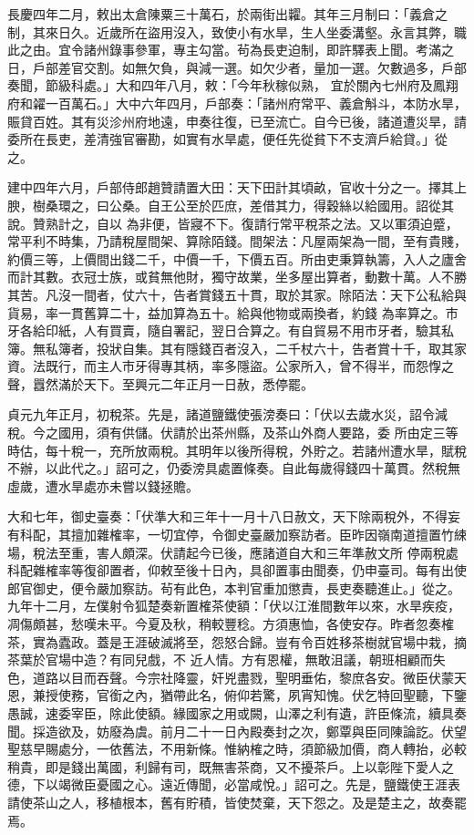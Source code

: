 \begin{pinyinscope}
 長慶四年二月，敕出太倉陳粟三十萬石，於兩街出糶。其年三月制曰：「義倉之制，其來日久。近歲所在盜用沒入，致使小有水旱，生人坐委溝壑。永言其弊，職此之由。宜令諸州錄事參軍，專主勾當。茍為長吏迫制，即許驛表上聞。考滿之日，戶部差官交割。如無欠負，與減一選。如欠少者，量加一選。欠數過多，戶部奏聞，節級科處。」大和四年八月，敕：「今年秋稼似熟，
 宜於關內七州府及鳳翔府和糴一百萬石。」大中六年四月，戶部奏：「諸州府常平、義倉斛斗，本防水旱，賑貸百姓。其有災沴州府地遠，申奏往復，已至流亡。自今已後，諸道遭災旱，請委所在長吏，差清強官審勘，如實有水旱處，便任先從貧下不支濟戶給貸。」從之。



 建中四年六月，戶部侍郎趙贊請置大田：天下田計其頃畝，官收十分之一。擇其上腴，樹桑環之，曰公桑。自王公至於匹庶，差借其力，得穀絲以給國用。詔從其說。贊熟計之，自以
 為非便，皆寢不下。復請行常平稅茶之法。又以軍須迫蹙，常平利不時集，乃請稅屋間架、算除陌錢。間架法：凡屋兩架為一間，至有貴賤，約價三等，上價間出錢二千，中價一千，下價五百。所由吏秉算執籌，入人之廬舍而計其數。衣冠士族，或貧無他財，獨守故業，坐多屋出算者，動數十萬。人不勝其苦。凡沒一間者，仗六十，告者賞錢五十貫，取於其家。除陌法：天下公私給與貨易，率一貫舊算二十，益加算為五十。給與他物或兩換者，約錢
 為率算之。市牙各給印紙，人有買賣，隨自署記，翌日合算之。有自貿易不用市牙者，驗其私簿。無私簿者，投狀自集。其有隱錢百者沒入，二千杖六十，告者賞十千，取其家資。法既行，而主人市牙得專其柄，率多隱盜。公家所入，曾不得半，而怨惸之聲，囂然滿於天下。至興元二年正月一日赦，悉停罷。



 貞元九年正月，初稅茶。先是，諸道鹽鐵使張滂奏曰：「伏以去歲水災，詔令減稅。今之國用，須有供儲。伏請於出茶州縣，及茶山外商人要路，委
 所由定三等時估，每十稅一，充所放兩稅。其明年以後所得稅，外貯之。若諸州遭水旱，賦稅不辦，以此代之。」詔可之，仍委滂具處置條奏。自此每歲得錢四十萬貫。然稅無虛歲，遭水旱處亦未嘗以錢拯贍。



 大和七年，御史臺奏：「伏準大和三年十一月十八日赦文，天下除兩稅外，不得妄有科配，其擅加雜榷率，一切宜停，令御史臺嚴加察訪者。臣昨因嶺南道擅置竹綀場，稅法至重，害人頗深。伏請起今已後，應諸道自大和三年準赦文所
 停兩稅處科配雜榷率等復卻置者，仰敕至後十日內，具卻置事由聞奏，仍申臺司。每有出使郎官御史，便令嚴加察訪。茍有此色，本判官重加懲責，長吏奏聽進止。」從之。九年十二月，左僕射令狐楚奏新置榷茶使額：「伏以江淮間數年以來，水旱疾疫，凋傷頗甚，愁嘆未平。今夏及秋，稍較豐稔。方須惠恤，各使安存。昨者忽奏榷茶，實為蠹政。蓋是王涯破滅將至，怨怒合歸。豈有令百姓移茶樹就官場中栽，摘茶葉於官場中造？有同兒戲，不
 近人情。方有恩權，無敢沮議，朝班相顧而失色，道路以目而吞聲。今宗社降靈，奸兇盡戮，聖明垂佑，黎庶各安。微臣伏蒙天恩，兼授使務，官銜之內，猶帶此名，俯仰若驚，夙宵知愧。伏乞特回聖聽，下鑒愚誠，速委宰臣，除此使額。緣國家之用或闕，山澤之利有遺，許臣條流，續具奏聞。採造欲及，妨廢為虞。前月二十一日內殿奏封之次，鄭覃與臣同陳論訖。伏望聖慈早賜處分，一依舊法，不用新條。惟納榷之時，須節級加價，商人轉抬，必較
 稍貴，即是錢出萬國，利歸有司，既無害茶商，又不擾茶戶。上以彰陛下愛人之德，下以竭微臣憂國之心。遠近傳聞，必當咸悅。」詔可之。先是，鹽鐵使王涯表請使茶山之人，移植根本，舊有貯積，皆使焚棄，天下怨之。及是楚主之，故奏罷焉。




\end{pinyinscope}
